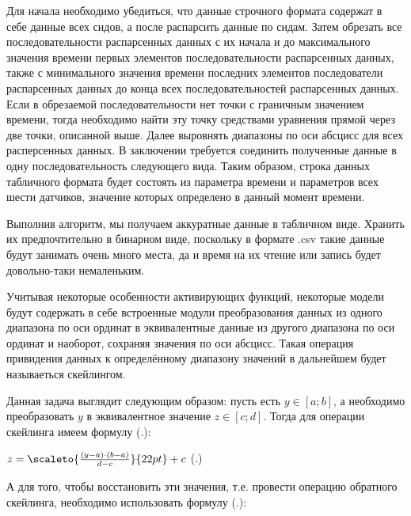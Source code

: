 {  \par \redline Для начала необходимо убедиться, что данные строчного формата содержат в себе данные всех сидов, а после распарсить данные по сидам. Затем обрезать все последовательности распарсенных данных с их начала и до максимального значения времени первых элементов последовательности распарсенных данных, также с минимального значения времени последних элементов последователи распарсенных данных до конца всех последовательностей распарсенных данных. Если в обрезаемой последовательности нет точки с граничным значением времени, тогда необходимо найти эту точку средствами уравнения прямой через две точки, описанной выше. Далее выровнять диапазоны по оси абсцисс для всех расперсенных данных. В заключении требуется соединить полученные данные в одну последовательность следующего вида. Таким образом, строка данных табличного формата будет состоять из параметра времени и параметров всех шести датчиков, значение которых определено в данный момент времени. 

  \par \redline Выполнив алгоритм, мы получаем аккуратные данные в табличном виде. Хранить их предпочтительно в бинарном виде, поскольку в формате .csv такие данные будут занимать очень много места, да и время на их чтение или запись будет довольно-таки немаленьким. 

  \par \redline Учитывая некоторые особенности активирующих функций, некоторые модели будут содержать в себе встроенные модули преобразования данных из одного диапазона по оси ординат в эквивалентные данные из другого диапазона по оси ординат и наоборот, сохраняя значения по оси абсцисс. Такая операция привидения данных к определённому диапазону значений в дальнейшем будет называеться скейлингом.

  \par \redline Данная задача выглядит следующим образом: пусть есть $y \in \left[a; b\right]$, а необходимо преобразовать $y$ в эквивалентное значение $z \in \left[c; d\right]$. Тогда для операции скейлинга имеем формулу (\thechaptercntr .\theformulacntr):

  \formulaspace \par \redline
    $z = \scaleto{\frac{\left(y - a\right) \cdot \left(b - a\right)}{d - c}}{22pt} + c$
    \hfill (\thechaptercntr .\theformulacntr) \redline
  \formulaspace \addtocounter{formulacntr}{1}

  \par \redline А для того, чтобы восстановить эти значения, т.е. провести операцию обратного скейлинга, необходимо использовать формулу (\thechaptercntr .\theformulacntr): 

}
